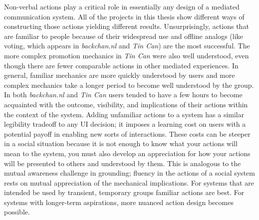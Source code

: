 Non-verbal actions play a critical role in essentially any design of a mediated communication system. All of the projects in this thesis show different ways of constructing those actions yielding different results. Unsurprisingly, actions that are familiar to people because of their widespread use and offline analogs (like voting, which appears in \emph{backchan.nl} and \emph{Tin Can}) are the most successful. The more complex promotion mechanics in \emph{Tin Can} were also well understood, even though there are fewer comparable actions in other mediated experiences. In general, familiar mechanics are more quickly understood by users and more complex mechanics take a longer period to become well understood by the group. In both \emph{backchan.nl} and \emph{Tin Can} users tended to have a few hours to become acquainted with the outcome, visibility, and implications of their actions within the context of the system. Adding unfamiliar actions to a system has a similar legibility tradeoff to any UI decision; it imposes a learning cost on users with a potential payoff in enabling new sorts of interactions. These costs can be steeper in a social situation because it is not enough to know what your actions will mean to the system, you must also develop an appreciation for how your actions will be presented to others and understood by them. This is analogous to the mutual awareness challenge in grounding; fluency in the actions of a social system rests on mutual appreciation of the mechanical implications. For systems that are intended be used by transient, temporary groups familiar actions are best. For systems with longer-term aspirations, more nuanced action design becomes possible.

